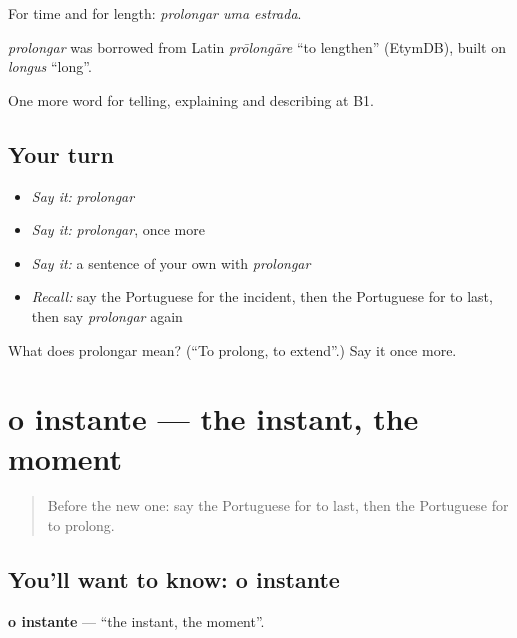 For time and for length: \emph{prolongar uma estrada}.

\begin{cousinweb}
\emph{prolongar} was borrowed from Latin \emph{prōlongāre} \textquotedblleft{}to lengthen\textquotedblright{} (EtymDB), built on \emph{longus} \textquotedblleft{}long\textquotedblright{}.
\end{cousinweb}

\begin{grammarlens}[title={What you've built}]
One more word for telling, explaining and describing at B1.
\end{grammarlens}

\subsection*{Your turn}
\begin{itemize}
\raggedright
  \item \emph{Say it:} \emph{prolongar}
  \item \emph{Say it:} \emph{prolongar}, once more
  \item \emph{Say it:} a sentence of your own with \emph{prolongar}
  \item \emph{Recall:} say the Portuguese for the incident, then the Portuguese for to last, then say \emph{prolongar} again
\end{itemize}

\begin{tcolorbox}[breakable,colback=teal!4,colframe=teal!35!black,title={Before you move on}]
What does prolongar mean? (\textquotedblleft{}To prolong, to extend\textquotedblright{}.) Say it once more.
\end{tcolorbox}
\section[o instante]{o instante — the instant, the moment}

\label{lesson:PT-C272-instante}



\begin{quote}
Before the new one: say the Portuguese for to last, then the Portuguese for to prolong.
\end{quote}

\subsection*{You'll want to know: o instante}
\textbf{o instante} — \textquotedblleft{}the instant, the moment\textquotedblright{}.

